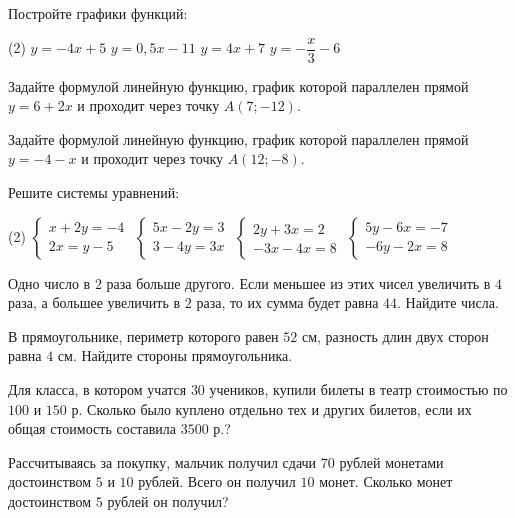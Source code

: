 \begin{class}[number=8]
	\begin{listofex}
		\item Постройте графики функций:
		\begin{tasks}(2)
			\task \( y=-4x+5 \)
			\task \( y=0,5x-11 \)
			\task \( y=4x+7 \)
			\task \( y=-\dfrac{ x }{ 3 }-6 \)
		\end{tasks}
		\item Задайте формулой линейную функцию, график которой параллелен прямой \(y=6+2x\) и проходит через точку \(A(7; -12)\).
		\item Задайте формулой линейную функцию, график которой параллелен прямой \(y=-4-x\) и проходит через точку \(A(12; -8)\).
		\item Решите системы уравнений:
		\begin{tasks}(2)
			\task \( \begin{cases} x+2y=-4 \\ 2x=y-5 \end{cases} \)
			\task \( \begin{cases} 5x-2y=3 \\ 3-4y=3x \end{cases} \)
			\task \( \begin{cases} 2y+3x=2\\-3x-4x=8 \end{cases} \)
			\task \( \begin{cases} 5y-6x=-7 \\ -6y-2x=8 \end{cases} \)
		\end{tasks}
		
		\item Одно число в \(2\) раза больше другого. Если меньшее из этих чисел увеличить в \(4\) раза, а большее увеличить в \(2\) раза, то их сумма будет равна \(44\). Найдите числа.
		\item В прямоугольнике, периметр которого равен \(52\) см, разность длин двух сторон равна \(4\) см. Найдите стороны прямоугольника.
		\item Для класса, в котором учатся \(30\) учеников, купили билеты в театр стоимостью по \(100\) и \(150\) р. Сколько было куплено отдельно тех и других билетов, если их общая стоимость составила \(3500\) р.?
		\item Рассчитываясь за покупку, мальчик получил сдачи \(70\) рублей монетами достоинством \(5\) и \(10\) рублей. Всего он получил \(10\) монет. Сколько монет достоинством \(5\) рублей он получил?
	\end{listofex}
\end{class}

